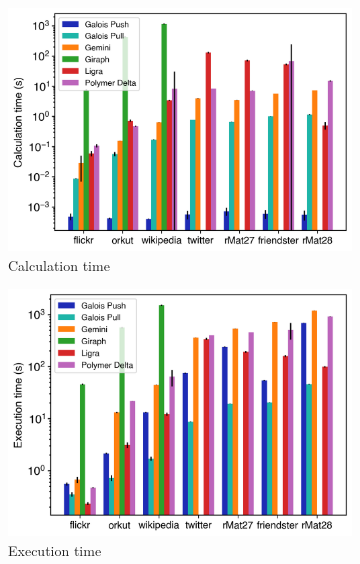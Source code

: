 \begin{figure}
	\hfil
	\begin{subfigure}{0.32\textwidth}
		\includegraphics[width=\linewidth]{../../plots/singleNodePR_calcTime.png}
		\caption{Calculation time}
		\label{fig:singleNodePR_calc}
	\end{subfigure}
	\hfil
	\begin{subfigure}{0.32\textwidth}
		\includegraphics[width=\linewidth]{../../plots/singleNodePR_execTime.png}
		\caption{Execution time}
		\label{fig:singleNodePR_exec}
	\end{subfigure}
	\hfil
	\begin{subfigure}{0.32\textwidth}

\end{subfigure}
\end{figure}
